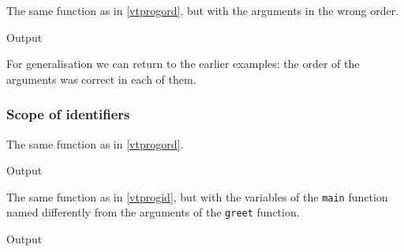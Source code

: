 \begin{frame}[fragile]\label{vtprogordcon}
  \begin{example}
    The same function as in \cref{vtprogord}, but with the arguments in the 
    wrong order.
  \end{example}

  \begin{block}{Output}
  \end{block}
\end{frame}

For generalisation we can return to the earlier examples: the order of the
arguments was correct in each of them.


\subsubsection{Scope of identifiers}

\begin{frame}[fragile]\label{vtprogid}
  \begin{example}
    The same function as in \cref{vtprogord}.
  \end{example}

  \begin{block}{Output}
  \end{block}
\end{frame}

\begin{frame}[fragile]\label{vtprogidcon}
  \begin{example}
    The same function as in \cref{vtprogid}, but with the variables of the 
    \texttt{main} function named differently from the arguments of 
    the \texttt{greet} function.
  \end{example}

  \begin{block}{Output}
  \end{block}
\end{frame}

